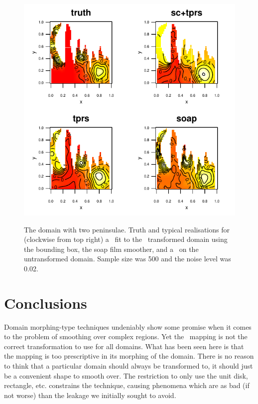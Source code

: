 \begin{figure}
\centering
\includegraphics[width=6in]{sc/figs/wigglytop2-bbox-real.pdf} \\
\caption{The domain with two peninsulae. Truth and typical realisations for (clockwise from top right) a \tprs\ fit to the \sch\ transformed domain using the bounding box, the soap film smoother, and a \tprs\ on the untransformed domain. Sample size was 500 and the noise level was 0.02.}
\label{wigglytop2-bbox-real}
\end{figure}


\section{Conclusions}
\label{sc-conclusions}

Domain morphing-type techniques undeniably show some promise when it comes to the problem of smoothing over complex regions. Yet the \sch\ mapping is not the correct transformation to use for  all domains. What has been seen here is that the mapping is too prescriptive in its morphing of the domain. There is no reason to think that a particular domain should always be transformed to, it should just be a convenient shape to smooth over. The restriction to only use the unit disk, rectangle, etc. constrains the technique, causing phenomena which are as bad (if not worse) than the leakage we initially sought to avoid.

